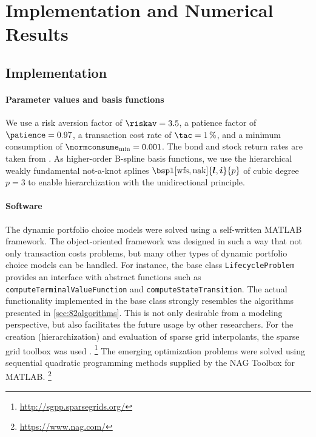 \section{Implementation and Numerical Results}
\label{sec:84results}


\parbox{1em}{}
\vspace{-3em}



\printornamentsfalse
\subsection{Implementation}
\printornamentstrue

\paragraph{Parameter values and basis functions}

We use
a risk aversion factor of $\riskav = 3.5$,
a patience factor of $\patience = 0.97$,
a transaction cost rate of $\tac = \SI{1}{\percent}$, and
a minimum consumption of $\normconsume_{\min} = 0.001$.
The bond and stock return rates are taken from \cite{Cai10Stable}.
As higher-order B-spline basis functions,
we use the hierarchical weakly fundamental not-a-knot splines
$\bspl[\wfs,\nak]{\*l,\*i}{p}$ of cubic degree $p = 3$
to enable hierarchization with the unidirectional principle.

\vspace*{-0.5em}

\paragraph{Software}

The dynamic portfolio choice models were solved using a self-written
MATLAB framework.
The object-oriented framework was designed in such a way that
not only transaction costs problems,
but many other types of dynamic portfolio choice models can be handled.
For instance, the base class \texttt{LifecycleProblem} provides
an interface with abstract functions such as
\texttt{computeTerminalValueFunction} and
\texttt{computeStateTransition}.
The actual functionality implemented in the base class strongly resembles
the algorithms presented in \cref{sec:82algorithms}.
This is not only desirable from a modeling perspective,
but also facilitates the future usage by other researchers.
For the creation (hierarchization) and evaluation of sparse grid interpolants,
the sparse grid toolbox \sgpp was used \cite{Pflueger10Spatially}.%
\footnote{%
  \url{http://sgpp.sparsegrids.org/}%
}
The emerging optimization problems were solved using
sequential quadratic programming methods supplied by the
NAG Toolbox for MATLAB.%
\footnote{%
  \url{https://www.nag.com/}%
}




